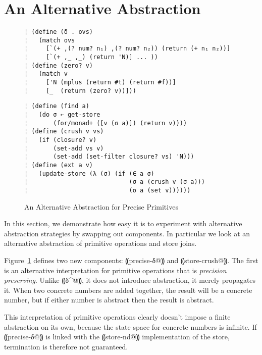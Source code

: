 \section{An Alternative Abstraction}\label{s:alt-abstraction}

\begin{figure} %
\begin{lstlisting}
¦ (define (δ . ovs)
¦   (match ovs
¦     [`(+ ,(? num? n₁) ,(? num? n₂)) (return (+ n₁ n₂))]
¦     [`(+ ,_ ,_) (return 'N)] ... ))
¦ (define (zero? v)
¦   (match v
¦     ['N (mplus (return #t) (return #f))]
¦     [_  (return (zero? v))]))
\end{lstlisting}
\figskip{}
\begin{lstlisting}
¦ (define (find a)
¦   (do σ ← get-store
¦       (for/monad+ ([v (σ a)]) (return v))))
¦ (define (crush v vs)
¦   (if (closure? v)
¦       (set-add vs v)
¦       (set-add (set-filter closure? vs) 'N)))
¦ (define (ext a v)
¦   (update-store (λ (σ) (if (∈ a σ)
¦                            (σ a (crush v (σ a)))
¦                            (σ a (set v))))))
\end{lstlisting}
\caption{An Alternative Abstraction for Precise Primitives}
\label{f:pres-delta}
\end{figure} %

In this section, we demonstrate how easy it is to experiment with alternative
abstraction strategies by swapping out components.  In particular we look at an
alternative abstraction of primitive operations and store joins.

Figure~\ref{f:pres-delta} defines two new components: ⸨precise-δ@⸩ and
⸨store-crush@⸩.  The first is an alternative interpretation for primitive
operations that is \emph{precision preserving}.  Unlike ⸨δ^@⸩, it does not
introduce abstraction, it merely propagates it.  When two concrete
numbers are added together, the result will be a concrete number, but if either
number is abstract then the result is abstract.

This interpretation of primitive operations clearly doesn't impose a finite
abstraction on its own, because the state space for concrete numbers is
infinite. If ⸨precise-δ@⸩ is linked with the ⸨store-nd@⸩ implementation of the
store, termination is therefore not guaranteed.  

